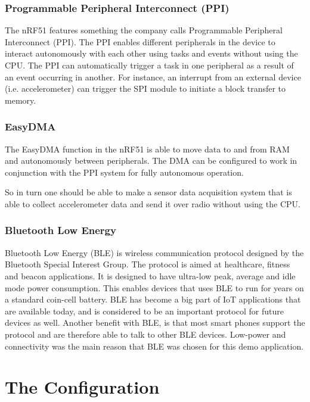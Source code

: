 \subsubsection{Programmable Peripheral Interconnect (PPI)}

The nRF51 features something the company calls Programmable Peripheral Interconnect (PPI). The PPI enables different peripherals in the device to interact autonomously with each other using tasks and events without using the CPU. The PPI can automatically trigger a task in one peripheral as a result of an event occurring in another. For instance, an interrupt from an external device (i.e. accelerometer) can trigger the SPI module to initiate a block transfer to memory. 

\subsubsection{EasyDMA}

The EasyDMA function in the nRF51 is able to move data to and from RAM and autonomously between peripherals. The DMA can be configured to work in conjunction with the PPI system for fully autonomous operation.

So in turn one should be able to make a sensor data acquisition system that is able to collect accelerometer data and send it over radio without using the CPU.

\subsubsection{Bluetooth Low Energy}

Bluetooth Low Energy (BLE) is wireless communication protocol designed by the Bluetooth Special Interest Group. The protocol is aimed at healthcare, fitness and beacon applications. It is designed to have ultra-low peak, average and idle mode power consumption. This enables devices that uses BLE to run for years on a standard coin-cell battery. BLE has become a big part of IoT applications that are available today, and is considered to be an important protocol for future devices as well. Another benefit with BLE, is that most smart phones support the protocol and are therefore able to talk to other BLE devices. Low-power and connectivity was the main reason that BLE was chosen for this demo application. 

\section{The Configuration}

